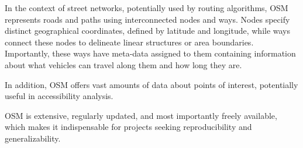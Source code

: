 In the context of street networks, potentially used by routing algorithms, OSM represents roads and paths using interconnected nodes and ways.
Nodes specify distinct geographical coordinates, defined by latitude and longitude, while ways connect these nodes to delineate linear structures or area boundaries.
Importantly, these ways have meta-data assigned to them containing information about what vehicles can travel along them and how long they are.

In addition, OSM offers vast amounts of data about points of interest, potentially useful in accessibility analysis.

OSM is extensive, regularly updated, and most importantly freely available, which makes it indispensable for projects seeking reproducibility and generalizability.
